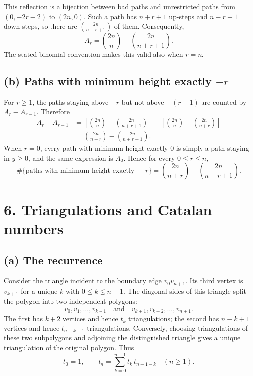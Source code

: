\documentclass[11pt]{article}
\begin{document}
This reflection is a bijection between bad paths and unrestricted paths from
\((0,-2r-2)\) to \((2n,0)\). Such a path has \(n+r+1\) up-steps and
\(n-r-1\) down-steps, so there are
\(\binom{2n}{n+r+1}\) of them. Consequently,
\[
\boxed{
    A_r=\binom{2n}{n}-\binom{2n}{n+r+1}.
}
\]
The stated binomial convention makes this valid also when \(r=n\).

\subsection*{(b) Paths with minimum height exactly \(-r\)}

For \(r\geq1\), the paths staying above \(-r\) but not above \(-(r-1)\)
are counted by \(A_r-A_{r-1}\). Therefore
\[
\begin{aligned}
A_r-A_{r-1}
 &=\left[\binom{2n}{n}-\binom{2n}{n+r+1}\right]
   -\left[\binom{2n}{n}-\binom{2n}{n+r}\right]\\
 &=\binom{2n}{n+r}-\binom{2n}{n+r+1}.
\end{aligned}
\]
When \(r=0\), every path with minimum height exactly \(0\) is simply a path
staying in \(y\geq0\), and the same expression is \(A_0\). Hence for every
\(0\leq r\leq n\),
\[
\boxed{
\#\{\text{paths with minimum height exactly }-r\}
 =\binom{2n}{n+r}-\binom{2n}{n+r+1}.
}
\]

\section*{6. Triangulations and Catalan numbers}

\subsection*{(a) The recurrence}

Consider the triangle incident to the boundary edge \(v_0v_{n+1}\). Its
third vertex is \(v_{k+1}\) for a unique \(k\) with \(0\leq k\leq n-1\).
The diagonal sides of this triangle split the polygon into two independent
polygons:
\[
    v_0,v_1,\ldots,v_{k+1}
    \quad\text{and}\quad
    v_{k+1},v_{k+2},\ldots,v_{n+1}.
\]
The first has \(k+2\) vertices and hence \(t_k\) triangulations; the second
has \(n-k+1\) vertices and hence \(t_{n-k-1}\) triangulations. Conversely,
choosing triangulations of these two subpolygons and adjoining the
distinguished triangle gives a unique triangulation of the original
polygon. Thus
\[
\boxed{
    t_0=1,\qquad
    t_n=\sum_{k=0}^{n-1}t_k\,t_{n-1-k}\quad(n\geq1).
}
\]
\end{document}
